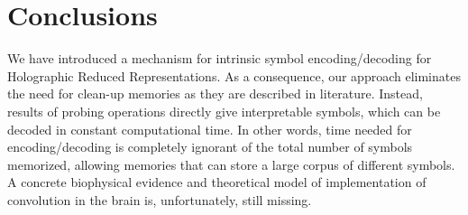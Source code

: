 \documentclass[conference]{IEEEtran}
\begin{document}
	\section{Conclusions}
	We have introduced a mechanism for intrinsic symbol encoding/decoding for Holographic Reduced Representations.
As a consequence, our approach eliminates the need for clean-up memories as they are described in literature.
Instead, results of probing operations directly give interpretable symbols, which can be decoded in constant computational time.
In other words, time needed for encoding/decoding is completely ignorant of the total number of symbols memorized, allowing memories that can store a large corpus of different symbols.
	A concrete biophysical evidence and theoretical model of implementation of convolution in the brain is, unfortunately, still missing.
	
	\printbibliography[heading=bibintoc]
	
\end{document}
